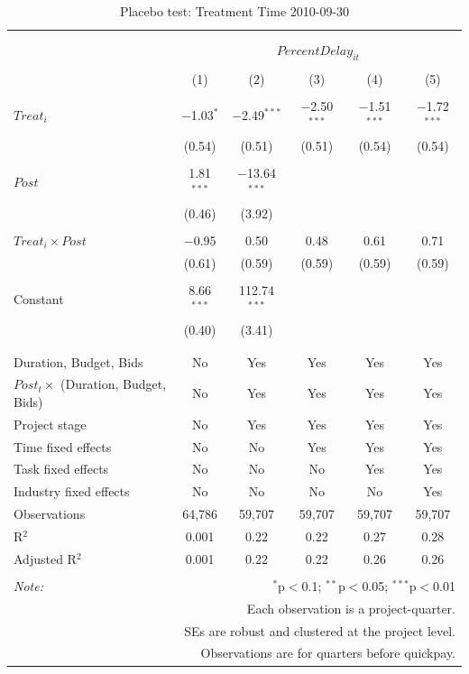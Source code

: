 \documentclass[
]{article}
\begin{document}
\begin{table}[H] \centering 
  \caption{Placebo test: Treatment Time 2010-09-30} 
  \label{} 
\small 
\begin{tabular}{@{\extracolsep{-2pt}}lccccc} 
\\[-1.8ex]\hline 
\hline \\[-1.8ex] 
\\[-1.8ex] & \multicolumn{5}{c}{$PercentDelay_{it}$} \\ 
\\[-1.8ex] & (1) & (2) & (3) & (4) & (5)\\ 
\hline \\[-1.8ex] 
 $Treat_i$ & $-$1.03$^{*}$ & $-$2.49$^{***}$ & $-$2.50$^{***}$ & $-$1.51$^{***}$ & $-$1.72$^{***}$ \\ 
  & (0.54) & (0.51) & (0.51) & (0.54) & (0.54) \\ 
  & & & & & \\ 
 $Post$ & 1.81$^{***}$ & $-$13.64$^{***}$ &  &  &  \\ 
  & (0.46) & (3.92) &  &  &  \\ 
  & & & & & \\ 
 $Treat_i \times Post$ & $-$0.95 & 0.50 & 0.48 & 0.61 & 0.71 \\ 
  & (0.61) & (0.59) & (0.59) & (0.59) & (0.59) \\ 
  & & & & & \\ 
 Constant & 8.66$^{***}$ & 112.74$^{***}$ &  &  &  \\ 
  & (0.40) & (3.41) &  &  &  \\ 
  & & & & & \\ 
\hline \\[-1.8ex] 
Duration, Budget, Bids & No & Yes & Yes & Yes & Yes \\ 
$Post_t \times$  (Duration, Budget, Bids) & No & Yes & Yes & Yes & Yes \\ 
Project stage & No & Yes & Yes & Yes & Yes \\ 
Time fixed effects & No & No & Yes & Yes & Yes \\ 
Task fixed effects & No & No & No & Yes & Yes \\ 
Industry fixed effects & No & No & No & No & Yes \\ 
Observations & 64,786 & 59,707 & 59,707 & 59,707 & 59,707 \\ 
R$^{2}$ & 0.001 & 0.22 & 0.22 & 0.27 & 0.28 \\ 
Adjusted R$^{2}$ & 0.001 & 0.22 & 0.22 & 0.26 & 0.26 \\ 
\hline 
\hline \\[-1.8ex] 
\textit{Note:}  & \multicolumn{5}{r}{$^{*}$p$<$0.1; $^{**}$p$<$0.05; $^{***}$p$<$0.01} \\ 
 & \multicolumn{5}{r}{Each observation is a project-quarter.} \\ 
 & \multicolumn{5}{r}{SEs are robust and clustered at the project level.} \\ 
 & \multicolumn{5}{r}{Observations are for quarters before quickpay.} \\ 
\end{tabular} 
\end{table}
\end{document}
